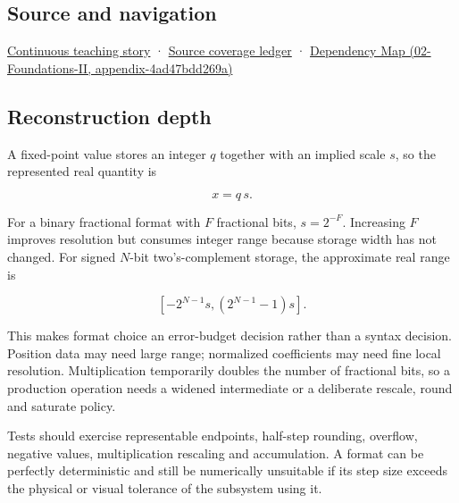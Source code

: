 \subsection{Source and navigation}\label{source-and-navigation}

\href{Continuous\%20Notes/Computing\%20Foundations\%20-\%20From\%20Bits\%20to\%20C++\%20and\%20Systems\%20APIs\#Choosing\%20what\%20information\%20to\%20keep}{Continuous teaching story} · \hyperref[appendix-fd090d982a15]{Source coverage ledger} · \href{}{Dependency Map (02-Foundations-II, appendix-4ad47bdd269a)}

\subsection{Reconstruction depth}\label{reconstruction-depth}

A fixed-point value stores an integer \(q\) together with an implied scale \(s\), so the represented real quantity is

\[
x=q\,s.
\]

For a binary fractional format with \(F\) fractional bits, \(s=2^{-F}\). Increasing \(F\) improves resolution but consumes integer range because storage width has not changed. For signed \(N\)-bit two's-complement storage, the approximate real range is

\[
[-2^{N-1}s,(2^{N-1}-1)s].
\]

This makes format choice an error-budget decision rather than a syntax decision. Position data may need large range; normalized coefficients may need fine local resolution. Multiplication temporarily doubles the number of fractional bits, so a production operation needs a widened intermediate or a deliberate rescale, round and saturate policy.

Tests should exercise representable endpoints, half-step rounding, overflow, negative values, multiplication rescaling and accumulation. A format can be perfectly deterministic and still be numerically unsuitable if its step size exceeds the physical or visual tolerance of the subsystem using it.
